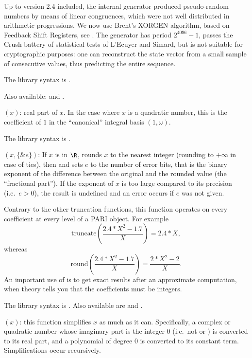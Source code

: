Up to
version 2.4 included, the internal generator produced pseudo-random numbers
by means of linear congruences, which were not well distributed in arithmetic
progressions. We now
use Brent's XORGEN algorithm, based on Feedback Shift Registers, see
. The generator has period
$2^{4096}-1$, passes the Crush battery of statistical tests of L'Ecuyer and
Simard, but is not suitable for cryptographic purposes: one can reconstruct
the state vector from a small sample of consecutive values, thus predicting
the entire sequence.

The library syntax is .

 Also available:  and .

$(x)$: \label{se:real}real part of $x$. In the case where $x$ is a quadratic number, this is the
coefficient of $1$ in the ``canonical'' integral basis $(1,\omega)$.

The library syntax is .

$(x,\{\&e\})$: \label{se:round}If $x$ is in $\R$, rounds $x$ to the nearest integer (rounding to
$+\infty$ in case of ties), then and sets $e$ to the number of error bits,
that is the binary exponent of the difference between the original and the
rounded value (the ``fractional part''). If the exponent of $x$ is too large
compared to its precision (i.e.~$e>0$), the result is undefined and an error
occurs if $e$ was not given.

 Contrary to the other truncation functions,
this function operates on every coefficient at every level of a PARI object.
For example
$$\text{truncate}\left(\dfrac{2.4*X^2-1.7}{X}\right)=2.4*X,$$
whereas
$$\text{round}\left(\dfrac{2.4*X^2-1.7}{X}\right)=\dfrac{2*X^2-2}{X}.$$
An important use of  is to get exact results after an approximate
computation, when theory tells you that the coefficients must be integers.

The library syntax is .
Also available are  and
.

$(x)$: \label{se:simplify}
this function simplifies $x$ as much as it can. Specifically, a complex or
quadratic number whose imaginary part is the integer 0 (i.e.~not 
or ) is converted to its real part, and a polynomial of degree $0$
is converted to its constant term. Simplifications occur recursively.

